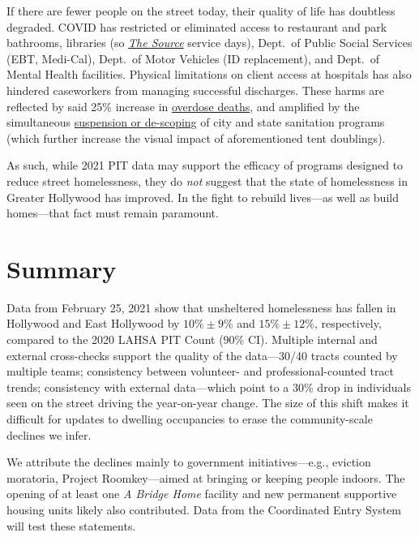 \documentclass[11pt,twocolumn]{article}
\def\resp{respectively}
\begin{document}
If there are fewer people on the street today, their quality of life has doubtless degraded. 
COVID has restricted or eliminated access to restaurant and park bathrooms, libraries (so 
\href{https://www.lapl.org/homeless-resources/the-source}{\it The Source} service days), Dept.~of Public Social Services 
(EBT, Medi-Cal), Dept.~of Motor Vehicles (ID replacement), and Dept.~of Mental Health facilities. Physical limitations 
on client access at hospitals has also hindered caseworkers from managing successful discharges. These 
harms are reflected by said 25\% increase in 
\href{https://www.latimes.com/california/story/2021-01-07/the-powerful-synthetic-opioid-fentanyl-is-behind-rising-deaths-in-the-homeless-population}{overdose deaths}, and amplified by the simultaneous 
\href{https://clkrep.lacity.org/onlinedocs/2020/20-0147_misc_3-17-20_p.pdf} {suspension or de-scoping} of city 
and state sanitation programs (which further increase the visual impact of aforementioned tent doublings). 

As such, while 2021 PIT data may support the efficacy of programs designed to reduce street 
homelessness, they do {\it not} suggest that the state of homelessness in Greater Hollywood has improved. 
In the fight to rebuild lives---as well as build homes---that fact must remain paramount.

\section{Summary}
\label{sec:summary}

Data from February 25, 2021 show that unsheltered homelessness has fallen in Hollywood and 
East Hollywood  by $10\%\pm9\%$ and $15\%\pm12\%$, \resp, compared to the 2020 LAHSA PIT 
Count (90\% CI). Multiple internal and external cross-checks support the quality of the 
data---30/40 tracts counted by multiple teams; consistency between volunteer- and 
professional-counted tract trends; consistency with external data---which
point to a 30\% drop in individuals seen on the street driving the year-on-year change.
The size of this shift makes it difficult for updates to dwelling occupancies to erase the 
community-scale declines we infer. 

We attribute the declines mainly to government initiatives---e.g., eviction moratoria, Project 
Roomkey---aimed at bringing or keeping people indoors. The opening of at least one {\it A Bridge Home} 
facility and new permanent supportive housing units likely also contributed. Data from the 
Coordinated Entry System will test these statements.
\end{document}
